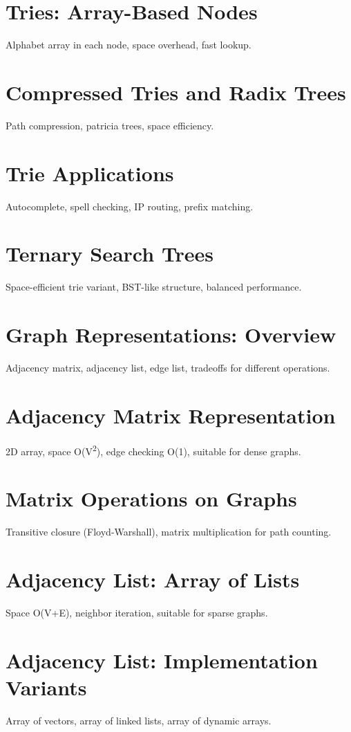 \chapter{Tries: Array-Based Nodes}
Alphabet array in each node, space overhead, fast lookup.

\chapter{Compressed Tries and Radix Trees}
Path compression, patricia trees, space efficiency.

\chapter{Trie Applications}
Autocomplete, spell checking, IP routing, prefix matching.

\chapter{Ternary Search Trees}
Space-efficient trie variant, BST-like structure, balanced performance.


\chapter{Graph Representations: Overview}
Adjacency matrix, adjacency list, edge list, tradeoffs for different operations.

\chapter{Adjacency Matrix Representation}
2D array, space O(V\textsuperscript{2}), edge checking O(1), suitable for dense graphs.

\chapter{Matrix Operations on Graphs}
Transitive closure (Floyd-Warshall), matrix multiplication for path counting.

\chapter{Adjacency List: Array of Lists}
Space O(V+E), neighbor iteration, suitable for sparse graphs.

\chapter{Adjacency List: Implementation Variants}
Array of vectors, array of linked lists, array of dynamic arrays.

